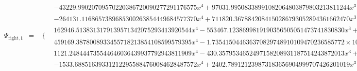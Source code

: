 \documentclass{article}
\begin{document}
\begin{landscape}
\begin{eqnarray*}
\begin{array}{cc}
\end{array}\\ 
\Psi_{\text{right},1} & = & \begin{array}{cc}
 \{ & 
\begin{array}{cc}
 -43229.99020709570220386720090277291176575 x^4+97031.99508338991082064803879803213811244 x^3-81323.84565323208722237998537762463426001 x^2+30163.45869106181581733520770528528280967 x-4177.827025551143464392910107143091504362 & x\geq \frac{1}{2}\land x<\frac{5}{8} \\
 -264131.1168657389685300263854449684577370 x^4+711820.3678842084150286793052894361662470 x^3-717927.7755624145186557998404900462345333 x^2+321187.0032041619852619632148306860255436 x-53782.11285026086178445094385071807999659 & x\geq \frac{5}{8}\land x<\frac{3}{4} \\
 162946.5138313179139571342075293413920544 x^4-553467.1238699819190356505051473741830830 x^3+702540.2129994980894898586856070645206227 x^2-395035.8391047942274200515198470105142190 x+83034.90431143884860406316863518116526313 & x\geq \frac{3}{4}\land x<\frac{7}{8} \\
 459169.3878008933455718213854108599579395 x^4-1.735415044636370829748910109470236585772\times 10^6 x^3+2.456702415323229429418289892883194754967\times 10^6 x^2-1.543817795251371207405270025880545625166\times 10^6 x+363361.0367636192621640688570567274980311 & x\geq \frac{7}{8}\land x<1 \\
 1121.248444735544646036439937792943811909 x^4-430.3579534652497158208931187514243872013 x^3+37.67382682124250772392180226002851769624 x^2 & x\geq 0\land x<\frac{1}{4} \\
 -1533.688516393312122955884760084628487572 x^4+2402.789121239873183656904999707426201019 x^3-1380.377465765804952057958884952574396278 x^2+343.7441298568667343008734900126152404134 x-31.20490221538416588931515680220140162606 & x\geq \frac{1}{4}\land x<\frac{1}{2}
\end{array}


\end{array}
\end{eqnarray*}
\end{landscape}
\end{document}
